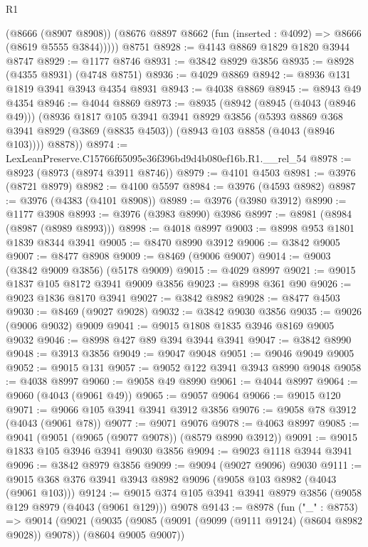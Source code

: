 \begin{lexlean}{R1}
\begin{coremodule}
        (@8666 (@8907 @8908))
        (@8676 @8897 @8662 (fun (inserted : @4092) => @8666 (@8619 @5555 @3844)))))
    @8751
@8928 := @4143 @8869 @1829 @1820 @3944 @8747
@8929 := @1177 @8746
@8931 := @3842 @8929 @3856
@8935 := @8928 (@4355 @8931) (@4748 @8751)
@8936 := @4029 @8869
@8942 := @8936 @131 @1819 @3941 @3943 @4354 @8931
@8943 := @4038 @8869
@8945 := @8943 @49 @4354
@8946 := @4044 @8869
@8973 := @8935
    (@8942
      (@8945 (@4043 (@8946 @49)))
      (@8936
        @1817
        @105
        @3941
        @3941
        @8929
        @3856
        (@5393 @8869 @368 @3941 @8929 (@3869 (@8835 @4503)) (@8943 @103 @8858 (@4043 (@8946 @103))))
        @8878))
@8974 := LexLeanPreserve.C15766f65095e36f396bd9d4b080ef16b.R1.__rel_54
@8978 := @8923 (@8973 (@8974 @3911 @8746))
@8979 := @4101 @4503
@8981 := @3976 (@8721 @8979)
@8982 := @4100 @5597
@8984 := @3976 (@4593 @8982)
@8987 := @3976 (@4383 (@4101 @8908))
@8989 := @3976 (@3980 @3912)
@8990 := @1177 @3908
@8993 := @3976 (@3983 @8990) @3986
@8997 := @8981 (@8984 (@8987 (@8989 @8993)))
@8998 := @4018 @8997
@9003 := @8998 @953 @1801 @1839 @8344 @3941
@9005 := @8470 @8990 @3912
@9006 := @3842 @9005
@9007 := @8477 @8908
@9009 := @8469 (@9006 @9007)
@9014 := @9003 (@3842 @9009 @3856) (@5178 @9009)
@9015 := @4029 @8997
@9021 := @9015 @1837 @105 @8172 @3941 @9009 @3856
@9023 := @8998 @361 @90
@9026 := @9023 @1836 @8170 @3941
@9027 := @3842 @8982
@9028 := @8477 @4503
@9030 := @8469 (@9027 @9028)
@9032 := @3842 @9030 @3856
@9035 := @9026 (@9006 @9032) @9009
@9041 := @9015 @1808 @1835 @3946 @8169 @9005 @9032
@9046 := @8998 @427 @89 @394 @3944 @3941
@9047 := @3842 @8990
@9048 := @3913 @3856
@9049 := @9047 @9048
@9051 := @9046 @9049 @9005
@9052 := @9015 @131
@9057 := @9052 @122 @3941 @3943 @8990 @9048
@9058 := @4038 @8997
@9060 := @9058 @49 @8990
@9061 := @4044 @8997
@9064 := @9060 (@4043 (@9061 @49))
@9065 := @9057 @9064
@9066 := @9015 @120
@9071 := @9066 @105 @3941 @3941 @3912 @3856
@9076 := @9058 @78 @3912 (@4043 (@9061 @78))
@9077 := @9071 @9076
@9078 := @4063 @8997
@9085 := @9041 (@9051 (@9065 (@9077 @9078)) (@8579 @8990 @3912))
@9091 := @9015 @1833 @105 @3946 @3941 @9030 @3856
@9094 := @9023 @1118 @3944 @3941
@9096 := @3842 @8979 @3856
@9099 := @9094 (@9027 @9096) @9030
@9111 := @9015 @368 @376 @3941 @3943 @8982 @9096 (@9058 @103 @8982 (@4043 (@9061 @103)))
@9124 := @9015 @374 @105 @3941 @3941 @8979 @3856 (@9058 @129 @8979 (@4043 (@9061 @129))) @9078
@9143 := @8978
    (fun ("_" : @8753) =>
    @9014
      (@9021
        (@9035 (@9085 (@9091 (@9099 (@9111 @9124) (@8604 @8982 @9028)) @9078)) (@8604 @9005 @9007))

\end{coremodule}
\end{lexlean}
